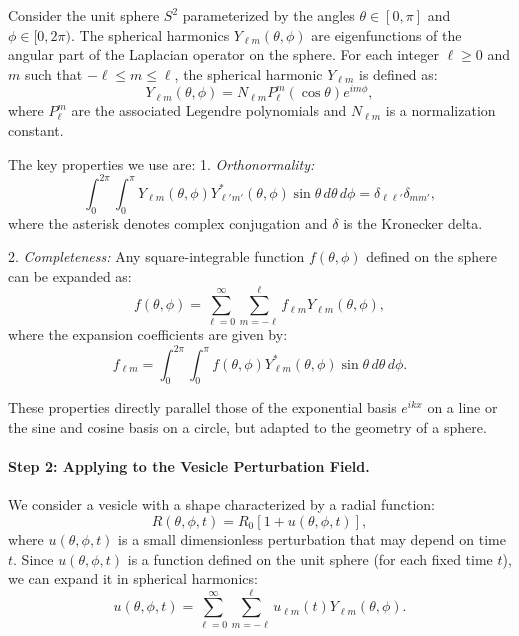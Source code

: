 \documentclass[12pt,a4paper]{article}
\begin{document}
Consider the unit sphere $S^2$ parameterized by the angles $\theta \in [0,\pi]$ and $\phi \in [0,2\pi)$. The spherical harmonics $Y_{\ell m}(\theta,\phi)$ are eigenfunctions of the angular part of the Laplacian operator on the sphere. For each integer $\ell \geq 0$ and $m$ such that $-\ell \leq m \leq \ell$, the spherical harmonic $Y_{\ell m}$ is defined as:
\begin{equation}
Y_{\ell m}(\theta,\phi) = N_{\ell m} P_{\ell}^{m}(\cos\theta) e^{i m \phi},
\end{equation}
where $P_{\ell}^{m}$ are the associated Legendre polynomials and $N_{\ell m}$ is a normalization constant.

The key properties we use are:
1. \emph{Orthonormality:}
   \begin{equation}
   \int_0^{2\pi}\!\int_0^{\pi} Y_{\ell m}(\theta,\phi) Y_{\ell' m'}^*(\theta,\phi)\sin\theta\,d\theta\,d\phi = \delta_{\ell\ell'}\delta_{mm'},
   \end{equation}
   where the asterisk denotes complex conjugation and $\delta$ is the Kronecker delta.

2. \emph{Completeness:}
   Any square-integrable function $f(\theta,\phi)$ defined on the sphere can be expanded as:
   \begin{equation}
   f(\theta,\phi) = \sum_{\ell=0}^{\infty}\sum_{m=-\ell}^{\ell} f_{\ell m} Y_{\ell m}(\theta,\phi),
   \end{equation}
   where the expansion coefficients are given by:
   \begin{equation}
   f_{\ell m} = \int_0^{2\pi}\!\int_0^{\pi} f(\theta,\phi) Y_{\ell m}^*(\theta,\phi)\sin\theta\,d\theta\,d\phi.
   \end{equation}

These properties directly parallel those of the exponential basis $e^{ikx}$ on a line or the sine and cosine basis on a circle, but adapted to the geometry of a sphere.

\paragraph{Step 2: Applying to the Vesicle Perturbation Field.}

We consider a vesicle with a shape characterized by a radial function:
\begin{equation}
R(\theta,\phi,t) = R_0[1+u(\theta,\phi,t)],
\end{equation}
where $u(\theta,\phi,t)$ is a small dimensionless perturbation that may depend on time $t$. Since $u(\theta,\phi,t)$ is a function defined on the unit sphere (for each fixed time $t$), we can expand it in spherical harmonics:
\begin{equation}
u(\theta,\phi,t) = \sum_{\ell=0}^{\infty}\sum_{m=-\ell}^{\ell} u_{\ell m}(t) Y_{\ell m}(\theta,\phi).
\end{equation}
\end{document}

